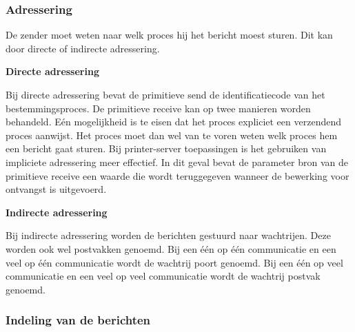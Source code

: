 \subsubsection{Adressering}

De zender moet weten naar welk proces hij het bericht moest sturen. Dit kan door directe of indirecte adressering.

\textbf{Directe adressering}

Bij directe adressering bevat de primitieve send de identificatiecode van het bestemmingsproces. De primitieve receive kan op twee manieren worden behandeld. Eén mogelijkheid is te eisen dat het proces expliciet een verzendend proces aanwijst. Het proces moet dan wel van te voren weten welk proces hem een bericht gaat sturen. Bij printer-server toepassingen is het gebruiken van impliciete adressering meer effectief. In dit geval bevat de parameter bron van de primitieve receive een waarde die wordt teruggegeven wanneer de bewerking voor ontvangst is uitgevoerd.

\textbf{Indirecte adressering}

Bij indirecte adressering worden de berichten gestuurd naar wachtrijen. Deze worden ook wel postvakken genoemd. Bij een één op één communicatie en een veel op één communicatie wordt de wachtrij poort genoemd. Bij een één op veel communicatie en een veel op veel communicatie wordt de wachtrij postvak genoemd.

\subsubsection{Indeling van de berichten}

